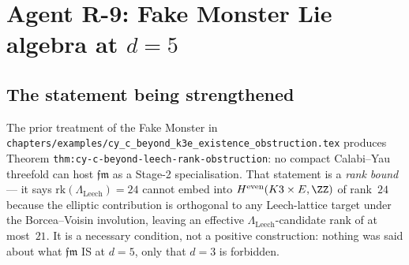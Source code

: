 \providecommand{\kBKM}{\kappa_{\mathrm{BKM}}}
\providecommand{\kch}{\kappa_{\mathrm{ch}}}
\providecommand{\kcat}{\kappa_{\mathrm{cat}}}
\providecommand{\kfib}{\kappa_{\mathrm{fiber}}}
\providecommand{\Ran}{\mathrm{Ran}}
\providecommand{\HH}{\mathrm{HH}}
\providecommand{\Coh}{\mathrm{Coh}}
\providecommand{\PhiFA}{\Phi^{\mathrm{FA}}}
\providecommand{\Sp}{\mathrm{Sp}}
\providecommand{\SpCh}{\mathrm{Sp}^{\mathrm{ch}}}
\providecommand{\SerreS}{\mathbb S}
\providecommand{\Leech}{\Lambda_{\mathrm{Leech}}}
\providecommand{\II}[1]{\mathrm{II}_{#1}}
\providecommand{\fm}{\mathfrak{fm}}
\providecommand{\gSch}{\mathfrak{g}^{\mathrm{Sch}}}
\providecommand{\CY}{\mathrm{CY}}
\providecommand{\Mod}{\mathrm{Mod}}
\providecommand{\Mbar}{\overline{\mathcal M}}
\providecommand{\Sgnt}{\mathrm{sgn}}
\providecommand{\Aut}{\mathrm{Aut}}
\providecommand{\Hom}{\mathrm{Hom}}
\providecommand{\Ext}{\mathrm{Ext}}
\providecommand{\HKR}{\mathrm{HKR}}
\providecommand{\Pic}{\mathrm{Pic}}
\providecommand{\NS}{\mathrm{NS}}
\providecommand{\RGamma}{R\Gamma}
\providecommand{\Rep}{\mathrm{Rep}}
\providecommand{\stab}{\mathrm{stab}}

\chapter*{Agent R-9: Fake Monster Lie algebra at $d = 5$}

\section*{The statement being strengthened}

The prior treatment of the Fake Monster in
\texttt{chapters/examples/cy\_c\_beyond\_k3e\_existence\_obstruction.tex}
produces Theorem \texttt{thm:cy-c-beyond-leech-rank-obstruction}: no
compact Calabi--Yau threefold can host $\fm$ as a Stage-2
specialisation. That statement is a \emph{rank bound} --- it says
$\mathrm{rk}(\Leech) = 24$ cannot embed into
$H^{\mathrm{even}}(K3 \times E, \ZZ)$ of rank~$24$ because the
elliptic contribution is orthogonal to any Leech-lattice target
under the Borcea--Voisin involution, leaving an effective
$\Leech$-candidate rank of at most~$21$. It is a necessary condition,
not a positive construction: nothing was said about what $\fm$ IS
at $d = 5$, only that $d = 3$ is forbidden.

